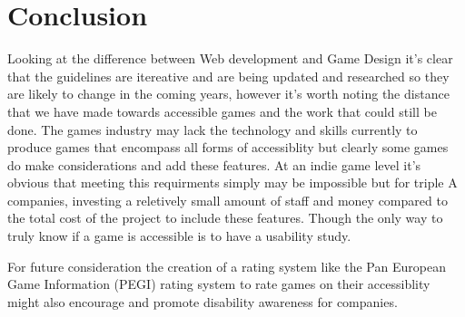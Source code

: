 \documentclass{scrartcl}
\begin{document}
\section{Conclusion}
Looking at the difference between Web development and Game Design it's clear that the guidelines are itereative and are being updated and researched so they are likely to change in the coming years, however it's worth noting the distance that we have made towards accessible games and the work that could still be done. The games industry may lack the technology and skills currently to produce games that encompass all forms of accessiblity but clearly some games do make considerations and add these features. At an indie game level it's obvious that meeting this requirments simply may be impossible but for triple A companies, investing a reletively small amount of staff and money compared to the total cost of the project to include these features. Though the only way to truly know if a game is accessible is to have a usability study. \cite{juicy2005valid} 

For future consideration the creation of a rating system like the Pan European Game Information (PEGI) rating system \cite{pegi2017ratings} to rate games on their accessiblity might also encourage and promote disability awareness for companies.



\end{document}
